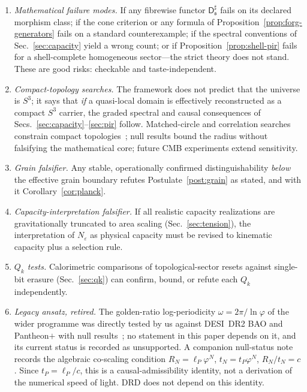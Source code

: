 \documentclass[11pt,a4paper]{article}
\theoremstyle{definition}
\theoremstyle{remark}
\newcommand{\Sthree}{S^{3}}
\newcommand{\lP}{\ell_{P}}
\newcommand{\tP}{t_{P}}
\newcommand{\Dsharp}{\mathsf{D}^{\sharp}}
\newcommand{\golden}{\varphi}
\begin{document}
\begin{enumerate}[label=(\arabic*)]
\item \emph{Mathematical failure modes.}  If any fibrewise functor
$\Dsharp_{\mathfrak s}$ fails on its declared morphism class; if the cone criterion or any
formula of Proposition~\ref{prop:forg-generators} fails on a standard counterexample; if the
spectral conventions of Sec.~\ref{sec:capacity} yield a wrong count; or if
Proposition~\ref{prop:shell-pir} fails for a shell-complete homogeneous sector---the strict
theory does not stand.  These are good risks: checkable and taste-independent.
\item \emph{Compact-topology searches.}  The framework does not predict that the universe is
$\Sthree$; it says that \emph{if} a quasi-local domain is effectively reconstructed as a
compact $\Sthree$ carrier, the graded spectral and causal consequences of
Secs.~\ref{sec:capacity}--\ref{sec:pir} follow.  Matched-circle and correlation searches
constrain compact topologies~\cite{Cornish1998,Planck2018}; null results bound the radius
without falsifying the mathematical core; future CMB experiments extend sensitivity.
\item \emph{Grain falsifier.}  Any stable, operationally confirmed distinguishability
\emph{below} the effective grain boundary refutes Postulate~\ref{post:grain} as stated, and
with it Corollary~\ref{cor:planck}.
\item \emph{Capacity-interpretation falsifier.}  If all realistic capacity realizations are
gravitationally truncated to area scaling (Sec.~\ref{sec:tension}), the interpretation of
$N_{\varepsilon}$ as physical capacity must be revised to kinematic capacity plus a selection
rule.
\item \emph{$Q_{k}$ tests.}  Calorimetric comparisons of topological-sector resets against
single-bit erasure (Sec.~\ref{sec:qk}) can confirm, bound, or refute each $Q_{k}$
independently.
\item \emph{Legacy ansatz, retired.}  The golden-ratio log-periodicity
$\omega=2\pi/\ln\golden$ of the wider programme was directly tested by us against DESI~DR2 BAO
and Pantheon$+$ with null results~\cite{BP2026null}; no statement in this paper depends on it,
and its current status is recorded as unsupported.  A companion null-status note records the
algebraic co-scaling condition $R_{N}=\lP\golden^{N}$, $t_{N}=\tP\golden^{N}$,
$R_{N}/t_{N}=c$.  Since $\tP=\lP/c$, this is a causal-admissibility identity, not a derivation
of the numerical speed of light.  DRD does not depend on this identity.
\end{enumerate}
\end{document}
